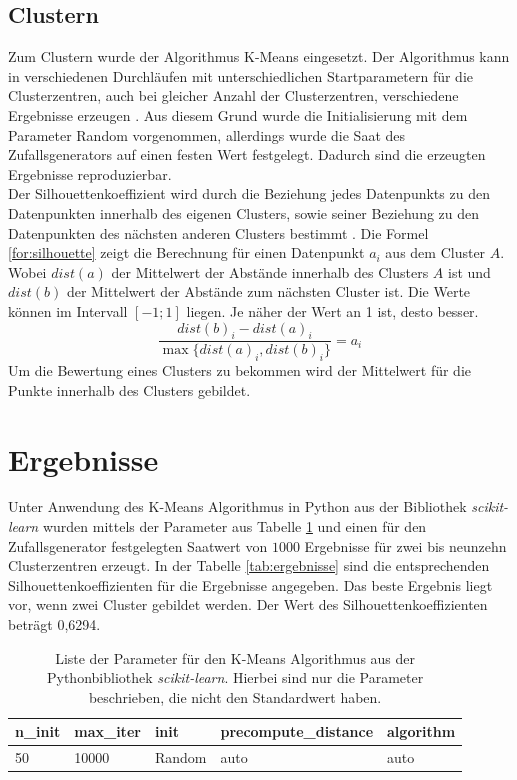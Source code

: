 \documentclass[12pt]{article}
\begin{document}
\subsection*{Clustern}
Zum Clustern wurde der Algorithmus K-Means eingesetzt. Der Algorithmus kann in verschiedenen Durchl\"aufen mit unterschiedlichen Startparametern f\"ur die Clusterzentren, auch bei gleicher Anzahl der Clusterzentren, verschiedene Ergebnisse erzeugen \cite{MacQueen1967}. Aus diesem Grund wurde die Initialisierung mit dem Parameter Random vorgenommen, allerdings wurde die Saat des Zufallsgenerators auf einen festen Wert festgelegt. Dadurch sind die erzeugten Ergebnisse reproduzierbar.\\
Der Silhouettenkoeffizient wird durch die Beziehung jedes Datenpunkts zu den Datenpunkten innerhalb des eigenen Clusters, sowie seiner Beziehung zu den Datenpunkten des n\"achsten anderen Clusters bestimmt \cite{Rousseeuw1987}. Die Formel \ref{for:silhouette} zeigt die Berechnung f\"ur einen Datenpunkt \(a_i\) aus dem Cluster \(A\). Wobei \(dist(a)\) der Mittelwert der Abst\"ande innerhalb des Clusters \(A\) ist und \(dist(b)\) der Mittelwert der Abst\"ande zum n\"achsten Cluster ist. Die Werte k\"onnen im Intervall \([-1;1]\) liegen. Je n\"aher der Wert an 1 ist, desto besser.
\begin{equation}\label{for:silhouette}
	\frac{dist(b)_i - dist(a)_i}{\max{\{dist(a)_i, dist(b)_i\}}} = a_i
\end{equation}
Um die Bewertung eines Clusters zu bekommen wird der Mittelwert f\"ur die Punkte innerhalb des Clusters gebildet.

\section*{Ergebnisse}
Unter Anwendung des K-Means Algorithmus in Python aus der Bibliothek \textit{scikit-learn} wurden mittels der Parameter aus Tabelle \ref{tab:Parameter} und einen f\"ur den Zufallsgenerator festgelegten Saatwert von \(1000\) Ergebnisse f\"ur zwei bis neunzehn Clusterzentren erzeugt. In der Tabelle \ref{tab:ergebnisse} sind die entsprechenden Silhouettenkoeffizienten f\"ur die Ergebnisse angegeben. Das beste Ergebnis liegt vor, wenn zwei Cluster gebildet werden. Der Wert des Silhouettenkoeffizienten betr\"agt 0,6294.

\begin{table}[h]
	\caption{\label{tab:Parameter}Liste der Parameter f\"ur den K-Means Algorithmus aus der Pythonbibliothek \textit{scikit-learn}. Hierbei sind nur die Parameter beschrieben, die nicht den Standardwert haben.}
	\noindent \centering{}
	\bgroup
	\def\arraystretch{2}  %
	\begin{tabular}{|l|l|l|l|l|}
		\hline
		\textbf{n\_init} & \textbf{max\_iter} & \textbf{init} & \textbf{precompute\_distance} & 	\textbf{algorithm}\\
		\hline \hline
		50 & 10000 & Random & auto & auto \\
		\hline
	\end{tabular}
	\egroup
\end{table}
\end{document}
